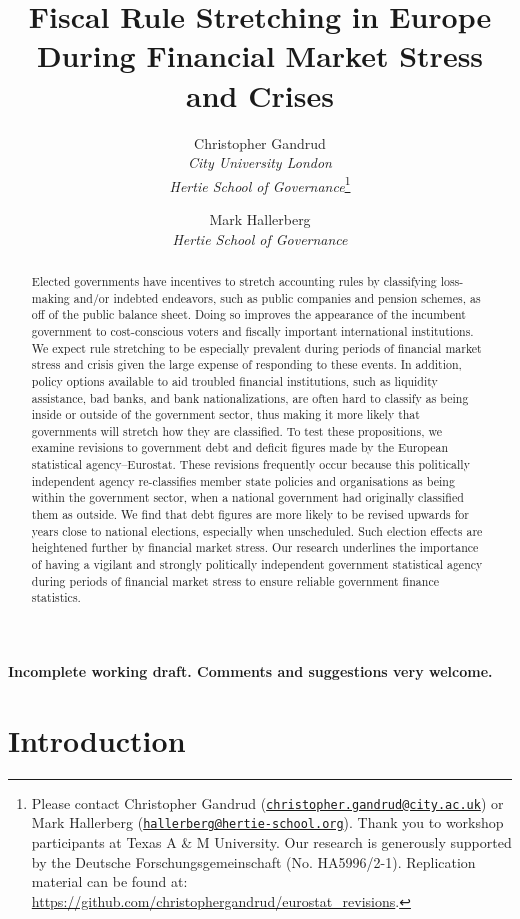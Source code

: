 \documentclass[]{article}
\title{Fiscal Rule Stretching in Europe During Financial Market Stress and Crises}
\author{Christopher Gandrud \\ \emph{City University London} \\ \emph{Hertie School of Governance}\footnote{Please contact Christopher Gandrud
(\href{mailto:christopher.gandrud@city.ac.uk}{\nolinkurl{christopher.gandrud@city.ac.uk}}) or Mark Hallerberg (\href{mailto:hallerberg@hertie-school.org}{\nolinkurl{hallerberg@hertie-school.org}}). Thank you to workshop participants at Texas A \& M University. Our research is generously supported by the Deutsche Forschungsgemeinschaft (No. HA5996/2-1). Replication material can be found at: \url{https://github.com/christophergandrud/eurostat_revisions}.}
\and
Mark Hallerberg \\ \emph{Hertie School of Governance}}
\begin{document}
\maketitle


\begin{center}
    \textbf{Incomplete working draft. Comments and suggestions very welcome.}
\end{center}

\begin{abstract}
    Elected governments have incentives to stretch accounting rules by classifying loss-making and/or indebted endeavors, such as public companies and pension schemes, as off of the public balance sheet. Doing so improves the appearance of the incumbent government to cost-conscious voters and fiscally important international institutions. We expect rule stretching to be especially prevalent during periods of financial market stress and crisis given the large expense of responding to these events. In addition, policy options available to aid troubled financial institutions, such as liquidity assistance, bad banks, and bank nationalizations, are often hard to classify as being inside or outside of the government sector, thus making it more likely that governments will stretch how they are classified. To test these propositions, we examine revisions to government debt and deficit figures made by the European statistical agency--Eurostat. These revisions frequently occur because this politically independent agency re-classifies member state policies and organisations as being within the government sector, when a national government had originally classified them as outside. We find that debt figures are more likely to be revised upwards for years close to national elections, especially when unscheduled. Such election effects are heightened further by financial market stress. Our research underlines the importance of having a vigilant and strongly politically independent government statistical agency during periods of financial market stress to ensure reliable government finance statistics.
\end{abstract}

\section{Introduction}
\end{document}
